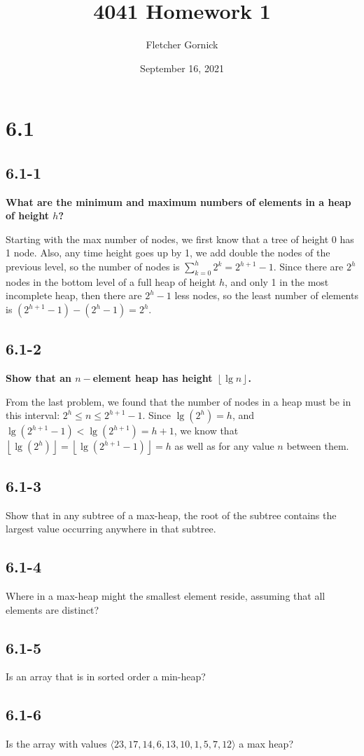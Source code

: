 \documentclass[11pt]{article}
\title{4041 Homework 1}
\author{Fletcher Gornick}
\date{September 16, 2021}
\def\lf{\left\lfloor}
\def\rf{\right\rfloor}
\begin{document}
 \maketitle 
 \section*{6.1}
 \subsection*{6.1-1}
  \textbf{What are the minimum and maximum numbers of elements in a heap of height $h$?}

  Starting with the max number of nodes, we first know that a tree of height 0 has 1 node.
  Also, any time height goes up by 1, we add double the nodes of the previous level, so the
  number of nodes is $\sum_{k=0}^{h}2^{k} = 2^{h+1}-1$.  Since there are $2^h$ nodes in the
  bottom level of a full heap of height $h$, and only 1 in the most incomplete heap, then 
  there are $2^h-1$ less nodes, so the least number of elements is $(2^{h+1}-1) - (2^h-1) = 2^h$.

 \subsection*{6.1-2}
  \textbf{Show that an $n-$element heap has height $\lf \lg n \rf$.}

  From the last problem, we found that the number of nodes in a heap must be in this interval:
  $2^h \leq n \leq 2^{h+1}-1$. Since $\lg{(2^h)} = h$, and $\lg{(2^{h+1}-1)} < \lg{(2^{h+1})} = h+1$,
  we know that $\lf \lg{(2^h)} \rf = \lf \lg{(2^{h+1}-1)} \rf = h$ as well as for any value $n$
  between them.
 \subsection*{6.1-3}
  Show that in any subtree of a max-heap, the root of the subtree contains the largest 
  value occurring anywhere in that subtree.
 \subsection*{6.1-4}
  Where in a max-heap might the smallest element reside, assuming that all elements are 
  distinct?
 \subsection*{6.1-5}
  Is an array that is in sorted order a min-heap?
 \subsection*{6.1-6}
  Is the array with values $\langle 23, 17, 14, 6, 13, 10, 1, 5, 7, 12 \rangle$ a max heap?
\end{document}
